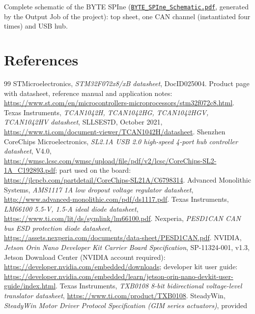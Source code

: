 \documentclass[11pt,a4paper]{article}
\begin{document}
Complete schematic of the BYTE SPIne (\href{run:BYTE_SPIne_Schematic.pdf}{\texttt{BYTE\_SPIne\_Schematic.pdf}}, generated by the Output
Job of the project): top sheet, one CAN channel (instantiated four times) and USB hub.



\section{References}

{\renewcommand{\section}[2]{}%
\begin{thebibliography}{99}
 STMicroelectronics, \textit{STM32F072x8/xB datasheet}, DocID025004. Product page with
datasheet, reference manual and application notes: \url{https://www.st.com/en/microcontrollers-microprocessors/stm32f072c8.html}.
 Texas Instruments, \textit{TCAN1042H, TCAN1042HG, TCAN1042HGV, TCAN1042HV
datasheet}, SLLSES7D, October 2021, \url{https://www.ti.com/document-viewer/TCAN1042H/datasheet}.
 Shenzhen CoreChips Microelectronics, \textit{SL2.1A USB 2.0 high-speed 4-port hub controller
datasheet}, V4.0, \url{https://wmsc.lcsc.com/wmsc/upload/file/pdf/v2/lcsc/CoreChips-SL2-1A_C192893.pdf}; part used on the board:
\url{https://jlcpcb.com/partdetail/CoreChips-SL21A/C6798314}.
 Advanced Monolithic Systems, \textit{AMS1117 1A low dropout voltage regulator datasheet},
\url{http://www.advanced-monolithic.com/pdf/ds1117.pdf}.
 Texas Instruments, \textit{LM66100 5.5-V, 1.5-A ideal diode datasheet},
\url{https://www.ti.com/lit/ds/symlink/lm66100.pdf}.
 Nexperia, \textit{PESD1CAN CAN bus ESD protection diode datasheet},
\url{https://assets.nexperia.com/documents/data-sheet/PESD1CAN.pdf}.
 NVIDIA, \textit{Jetson Orin Nano Developer Kit Carrier Board Specification}, SP-11324-001, v1.3,
Jetson Download Center (NVIDIA account required): \url{https://developer.nvidia.com/embedded/downloads}; developer kit user guide:
\url{https://developer.nvidia.com/embedded/learn/jetson-orin-nano-devkit-user-guide/index.html}.
 Texas Instruments, \textit{TXB0108 8-bit bidirectional voltage-level translator datasheet},
\url{https://www.ti.com/product/TXB0108}.
 SteadyWin, \textit{SteadyWin Motor Driver Protocol Specification (GIM series actuators)}, provided

\end{thebibliography}}
\end{document}
